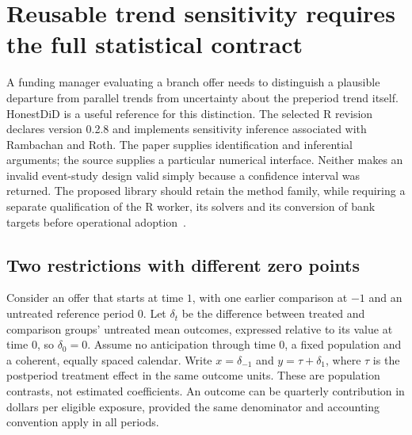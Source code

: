 \section{Reusable trend sensitivity requires the full statistical contract}
\label{exec22:hd-scope}

A funding manager evaluating a branch offer needs to distinguish a plausible
departure from parallel trends from uncertainty about the preperiod trend itself.
HonestDiD is a useful reference for this distinction. The selected R revision
declares version 0.2.8 and implements sensitivity inference associated with
Rambachan and Roth. The paper supplies identification and inferential arguments;
the source supplies a particular numerical interface. Neither makes an invalid
event-study design valid simply because a confidence interval was returned.
The proposed library should retain the method family, while requiring a separate
qualification of the R worker, its solvers and its conversion of bank targets
before operational adoption~\citep{rambachan2023,exec22_honestdid_engine}.

\subsection{Two restrictions with different zero points}
\label{exec22:hd-restrictions}

Consider an offer that starts at time $1$, with one earlier comparison at $-1$
and an untreated reference period $0$. Let $\delta_t$ be the difference between
treated and comparison groups' untreated mean outcomes, expressed relative to
its value at time $0$, so $\delta_0=0$. Assume no anticipation through time $0$,
a fixed population and a coherent, equally spaced calendar. Write $x=\delta_{-1}$
and $y=\tau+\delta_1$, where $\tau$ is the postperiod treatment effect in the same
outcome units. These are population contrasts, not estimated coefficients.
An outcome can be quarterly contribution in dollars per eligible exposure,
provided the same denominator and accounting convention apply in all periods.

